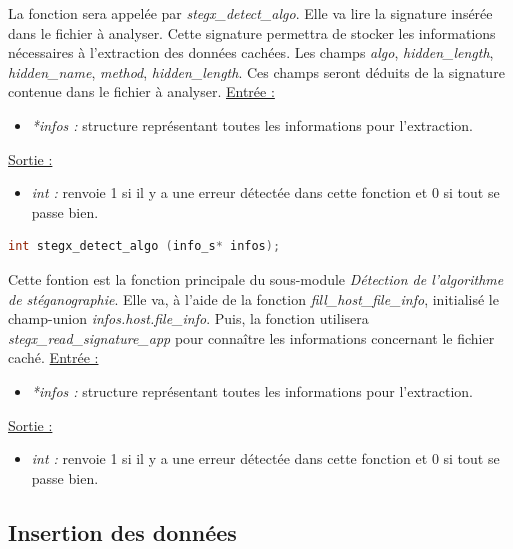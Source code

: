 \documentclass[11pt]{article}
\begin{document}
La fonction sera appelée par \textit{stegx\_detect\_algo}.
Elle va lire la signature insérée dans le fichier à analyser. 
Cette signature permettra de stocker les informations nécessaires à 
l'extraction des données cachées. 
Les champs \textit{algo}, \textit{hidden\_length}, 
\textit{hidden\_name}, \textit{method}, \textit{hidden\_length}. Ces champs 
seront déduits de la signature contenue dans le fichier à analyser. 
\newline
\underline{Entrée :} 
\begin{itemize}
\item \textit{*infos :} structure représentant toutes les informations pour 
l'extraction.  
\end{itemize}
\underline{Sortie :} 
\begin{itemize}
\item \textit{int :} renvoie 1 si il y a une erreur détectée dans cette 
fonction et 0 si tout se passe bien.  
\newline 
\end{itemize}

\begin{lstlisting}[language=c]
int stegx_detect_algo (info_s* infos); 
\end{lstlisting}

Cette fontion est la fonction principale du sous-module 
\textit{Détection de l'algorithme de stéganographie}. 
Elle va, à l'aide de la fonction \textit{fill\_host\_file\_info}, 
initialisé le champ-union \textit{infos.host.file\_info}. Puis, la 
fonction utilisera \textit{stegx\_read\_signature\_app} pour connaître les 
informations concernant le fichier caché. 
\newline
\underline{Entrée :} 
\begin{itemize}
\item \textit{*infos :} structure représentant toutes les informations pour 
l'extraction. 
\end{itemize}
\underline{Sortie :} 
\begin{itemize}
\item \textit{int :} renvoie 1 si il y a une erreur détectée dans cette 
fonction et 0 si tout se passe bien.  
\newline 
\end{itemize}

\subsection{Insertion des données}
\end{document}
